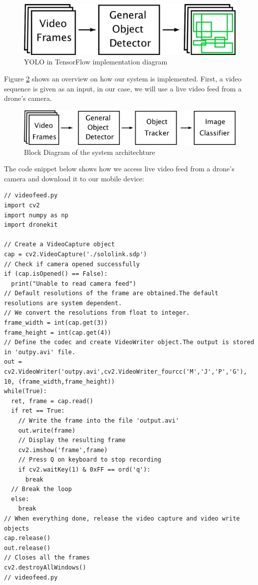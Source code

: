 \begin{figure}[h]
\setlength{\belowcaptionskip}{-30pt}
\centering
\includegraphics[scale=0.3]{figures/our_app_2.png}
\caption{YOLO in TensorFlow implementation diagram}
\label{our_app_2}
\end{figure}

\vspace{10mm}

Figure \ref{our_architecture} shows an overview on how our system is implemented. First, a video sequence is given as an input,  in our case, we will use a live video feed from a drone's camera.

\begin{figure}[h]
\setlength{\belowcaptionskip}{-10pt}
\centering
\includegraphics[scale=0.3]{figures/our_app.png}
\caption{Block Diagram of the system architechture}
\label{our_architecture}
\end{figure}

\vspace{200mm}

The code snippet below shows how we access live video feed from a drone's camera and download it to our mobile device:

\vspace{5mm}
\begin{lstlisting}
// videofeed.py
import cv2
import numpy as np
import dronekit

// Create a VideoCapture object
cap = cv2.VideoCapture('./sololink.sdp')
// Check if camera opened successfully
if (cap.isOpened() == False): 
  print("Unable to read camera feed")
// Default resolutions of the frame are obtained.The default resolutions are system dependent.
// We convert the resolutions from float to integer.
frame_width = int(cap.get(3))
frame_height = int(cap.get(4))
// Define the codec and create VideoWriter object.The output is stored in 'outpy.avi' file.
out = cv2.VideoWriter('outpy.avi',cv2.VideoWriter_fourcc('M','J','P','G'), 10, (frame_width,frame_height))
while(True):
  ret, frame = cap.read()
  if ret == True: 
    // Write the frame into the file 'output.avi'
    out.write(frame)
    // Display the resulting frame    
    cv2.imshow('frame',frame)
    // Press Q on keyboard to stop recording
    if cv2.waitKey(1) & 0xFF == ord('q'):
      break
  // Break the loop
  else:
    break 
// When everything done, release the video capture and video write objects
cap.release()
out.release()
// Closes all the frames
cv2.destroyAllWindows() 
// videofeed.py
\end{lstlisting}

